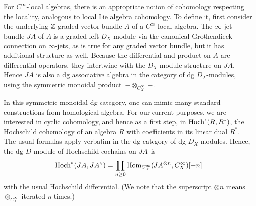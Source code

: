 %
%

For $C^\infty$-local algebras, there is an appropriate notion of cohomology respecting the locality, 
analogous to local Lie algebra cohomology. 
To define it, first consider the underlying $\mathbb Z$-graded vector bundle $A$ of a $C^\infty$-local algebra. 
The $\infty$-jet bundle $JA$ of $A$ is a graded left $D_X$-module via the canonical Grothendieck connection on $\infty$-jets,
as is true for any graded vector bundle,
but it has additional structure as well.
Because the differential and product on $A$ are differential operators, 
they intertwine with the $D_X$-module structure on $JA$.
Hence $JA$ is also a dg associative algebra in the category of dg $D_X$-modules,
using the symmetric monoidal product~$- \otimes_{C^\infty_X} -$. 



In this symmetric monoidal dg category, 
one can mimic many standard constructions from homological algebra.
For our current purposes, we are interested in cyclic cohomology,
and hence as a first step, in ${\rm Hoch}^*(R,R^*)$, the Hochschild cohomology of an algebra $R$ with coefficients in its linear dual $R^*$.
The usual formulas apply verbatim in the dg category of dg $D_X$-modules.
Hence, the dg $D$-module of Hochschild cochains on $JA$~is 
\[
{\rm Hoch}^* (JA, JA^\vee) = \prod_{n \geq 0} {\rm Hom}_{C^\infty_X} (JA^{\otimes n}, C^\infty_X)[-n]
\]
with the usual Hochschild differential.
(We note that the superscript $\otimes n$ means $\otimes_{C^\infty_X}$ iterated $n$ times.)

